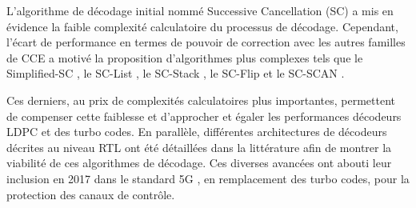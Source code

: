 \documentclass[../main.tex]{subfiles}
\begin{document}
L’algorithme de décodage initial nommé Successive Cancellation (SC) \cite{89,97} a mis en évidence la faible complexité calculatoire du processus de décodage. Cependant, l’écart de performance en termes de pouvoir de correction avec les autres familles de CCE a motivé la proposition d’algorithmes plus complexes tels que le Simplified-SC \cite{91, 92, 101}, le SC-List \cite{87, 122}, le SC-Stack \cite{SC:STACK}, le SC-Flip \cite{85, 86} et le SC-SCAN \cite{SC:SCAN}.

Ces derniers, au prix de complexités calculatoires plus importantes, permettent de compenser cette faiblesse et d'approcher et égaler les performances décodeurs LDPC et des turbo codes. En parallèle, différentes architectures de décodeurs décrites au niveau RTL ont été détaillées dans la littérature \cite{88, 89, 90, 91, 92, 93} afin de montrer la viabilité de ces algorithmes de décodage. Ces diverses avancées ont abouti leur inclusion en 2017 dans le standard 5G \cite{5g}, en remplacement des turbo codes, pour la protection des canaux de contrôle.
\end{document}
